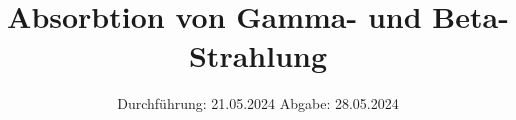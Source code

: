 

\subject{V704}
\title{Absorbtion von Gamma- und Beta-Strahlung}
\date{%
  Durchführung: 21.05.2024
  \hspace{3em}
  Abgabe: 28.05.2024}



\maketitle
\thispagestyle{empty}
\tableofcontents
\newpage






\printbibliography{}


